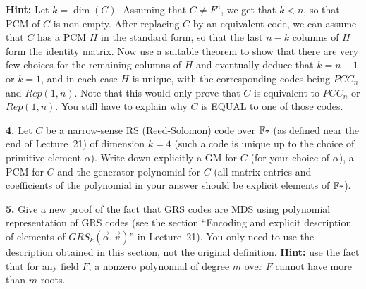 \documentclass[12pt]{amsart}
\begin{document}
{\bf Hint:} Let $k=\dim(C)$. Assuming that $C\neq F^n$, we get that $k<n$, so that PCM of $C$ is non-empty. After replacing 
$C$ by an equivalent code, we can assume that $C$ has a PCM $H$ in the standard form, so that the last $n-k$ columns of $H$
form the identity matrix. Now use a suitable theorem to show that there are very few choices for the remaining columns of $H$
and eventually deduce that $k=n-1$ or $k=1$, and in each case $H$ is unique, with the corresponding codes being $PCC_n$ and $Rep(1,n)$.
Note that this would only prove that $C$ is equivalent to $PCC_n$ or $Rep(1,n)$. You still have to explain why $C$ is EQUAL to one of those codes.
\skv

{\bf 4.} Let $C$ be a narrow-sense RS (Reed-Solomon) code over ${\mathbb F}_7$ (as defined near the end of Lecture~21) of dimension $k=4$ (such a code is unique up to the choice of primitive element $\alpha$). Write down explicitly a GM for $C$ (for your choice of $\alpha$), a PCM for $C$ and the generator polynomial for $C$ (all matrix entries and coefficients of the polynomial in your answer should be explicit elements of ${\mathbb F}_7$).
\skv

{\bf 5.} Give a new proof of the fact that GRS codes are MDS using polynomial representation of GRS codes (see the section
``Encoding and explicit description of elements of $GRS_k(\vec{\alpha}, \vec{v})$'' in Lecture~21). You only need to use the description obtained in this section, not the original definition. {\bf Hint:} use the fact that for any field $F$, a nonzero polynomial of degree $m$ over $F$ cannot have more than $m$ roots.
\skv
\end{document}
